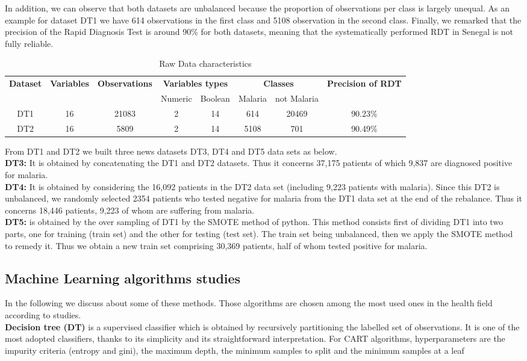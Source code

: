 In addition, we can observe that  both datasets are unbalanced because the proportion of observations per class is largely unequal. As an example for dataset DT1 we have 614 observations in the first class and 5108 observation in the second class. Finally, we remarked that the precision of the Rapid Diagnosis Test is around 90\% for both datasets, meaning that the systematically performed RDT in Senegal is not fully reliable.
\begin{table*}[h]
\centering
  \begin{tabular}{cccccccc}
    \toprule
    \multirow{2}{*}{\textbf{Dataset}} &
      \textbf{Variables}&\textbf{Observations}&
      \multicolumn{2}{c}{\textbf{Variables types}}& \multicolumn{2}{c}{\textbf{Classes}} & \textbf{Precision of RDT}\\
    & & & Numeric & Boolean & Malaria & not Malaria \\
    \midrule
    DT1 &16 & 21083  & 2 &  14& 614&20469 & 90.23\% \\
    DT2 & 16 & 5809 & 2 & 14 & 5108&701 & 90.49\% \\
    \bottomrule
  \end{tabular}
  \caption{Raw Data characteristics}\label{raw_data}
\end{table*}

From DT1 and DT2 we built three news datasets DT3, DT4 and DT5 data sets as below.\\
\textbf{DT3:}  It is obtained by concatenating the DT1 and DT2 datasets. Thus it concerns 37,175 patients of which 9,837 are diagnosed positive for malaria.\\
\textbf{DT4:} It is obtained by considering the 16,092 patients in the DT2 data set (including 9,223 patients with malaria). Since this DT2 is unbalanced, we randomly selected 2354 patients who tested negative for malaria from the DT1 data set at the end of the rebalance. Thus it concerns 18,446 patients, 9,223 of whom are suffering from malaria.\\
\textbf{DT5:} is obtained by the over sampling of DT1 by the SMOTE method of python. This method consists first of dividing DT1 into two parts, one for training (train set) and the other for testing (test set). The train set being unbalanced, then we apply the SMOTE method to remedy it. Thus we obtain a new train set comprising 30,369 patients, half of whom tested positive for malaria.
\subsection{Machine Learning algorithms studies}
In the following we discuss about some of these methods.  Those algorithms are chosen among the most used ones in the health field according to studies\cite{de2018binary,tomar2013survey}.\\
\textbf{Decision tree (DT)}\cite{Ro05} is a supervised classifier which is obtained by recursively partitioning the labelled set of observations. It is one of the most adopted classifiers, thanks to its simplicity and its straightforward interpretation. For CART algorithms, hyperparameters are the impurity criteria (entropy and gini), the maximum depth, the minimum samples to split and the minimum samples at a leaf

